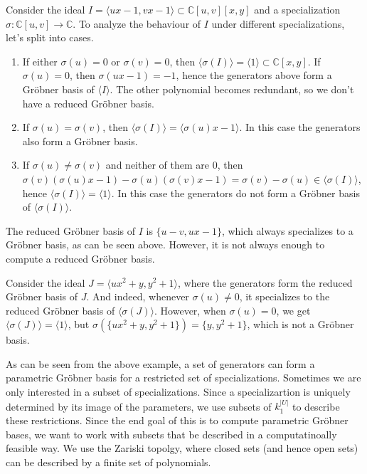 \documentclass[a4paper, 12pt]{article}
\newcommand{\C}{\mathbb{C}}
\theoremstyle{changedot}
\theoremstyle{changedotbreak}
\theoremstyle{nonumberplain}
\begin{document}
\begin{example}\upshape
  Consider the ideal $I = \langle ux - 1, vx - 1 \rangle \subset \C[u, v][x, y]$ and a specialization $\sigma : \C[u, v] \to \C$. To analyze the behaviour of $I$ under different specializations, let's split into cases.

  \begin{enumerate}
    \item If either $\sigma(u) = 0$ or $\sigma(v) = 0$, then $\langle \sigma(I) \rangle = \langle 1 \rangle \subset \C[x, y]$. If $\sigma(u) = 0$, then $\sigma(ux - 1) = -1$, hence the generators above form a Gröbner basis of $\langle I \rangle$. The other polynomial becomes redundant, so we don't have a reduced Gröbner basis.

    \item If $\sigma(u) = \sigma(v)$, then $\langle \sigma(I) \rangle = \langle \sigma(u)x - 1 \rangle$. In this case the generators also form a Gröbner basis.

    \item If $\sigma(u) \neq \sigma(v)$ and neither of them are 0, then $\sigma(v)(\sigma(u)x - 1) - \sigma(u)(\sigma(v)x - 1) = \sigma(v) - \sigma(u) \in \langle \sigma(I) \rangle$, hence $\langle \sigma(I) \rangle = \langle 1 \rangle$. In this case the generators do not form a Gröbner basis of $\langle \sigma(I) \rangle$.
  \end{enumerate}

  The reduced Gröbner basis of $I$ is $\{u - v, ux - 1\}$, which always specializes to a Gröbner basis, as can be seen above. However, it is not always enough to compute a reduced Gröbner basis.

  Consider the ideal $J = \langle ux^{2} + y, y^{2} + 1 \rangle$, where the generators form the reduced Gröbner basis of $J$. And indeed, whenever $\sigma(u) \neq 0$, it specializes to the reduced Gröbner basis of $\langle \sigma(J) \rangle$. However, when $\sigma(u) = 0$, we get $\langle \sigma(J) \rangle = \langle 1 \rangle$, but $\sigma(\{ux^{2} + y, y^{2} + 1\}) = \{y, y^{2} + 1\}$, which is not a Gröbner basis.
\end{example}

As can be seen from the above example, a set of generators can form a parametric Gröbner basis for a restricted set of specializations. Sometimes we are only interested in a subset of specializations. Since a specializartion is uniquely determined by its image of the parameters, we use subsets of $k_{1}^{|U|}$ to describe these restrictions. Since the end goal of this is to compute parametric Gröbner bases, we want to work with subsets that be described in a computatinoally feasible way. We use the Zariski topolgy, where closed sets (and hence open sets) can be described by a finite set of polynomials.
\end{document}
